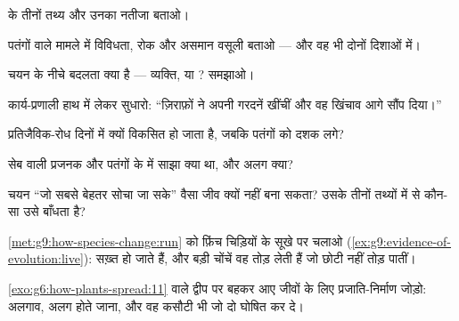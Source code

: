 \begin{exercise}[$\star$]\label{exo:g9:how-species-change:1}
 के तीनों तथ्य और उनका नतीजा बताओ।
\end{exercise}

\begin{exercise}[$\star$]\label{exo:g9:how-species-change:2}
पतंगों वाले मामले में विविधता, रोक और असमान वसूली बताओ --- और वह भी
दोनों दिशाओं में।
\end{exercise}

\begin{exercise}[$\star$]\label{exo:g9:how-species-change:3}
चयन के नीचे बदलता क्या है --- व्यक्ति, या ? समझाओ।
\end{exercise}

\begin{exercise}[$\star$]\label{exo:g9:how-species-change:4}
कार्य-प्रणाली हाथ में लेकर सुधारो: ``ज़िराफ़ों ने अपनी गरदनें खींचीं और
वह खिंचाव आगे सौंप दिया।''
\end{exercise}

\begin{exercise}[$\star$]\label{exo:g9:how-species-change:5}
प्रतिजैविक-रोध दिनों में क्यों विकसित हो जाता है, जबकि पतंगों को दशक
लगे?
\end{exercise}

\begin{exercise}[$\star$]\label{exo:g9:how-species-change:6}
सेब वाली प्रजनक और पतंगों के  में साझा क्या था, और अलग क्या?
\end{exercise}

\begin{exercise}[$\star\star$]\label{exo:g9:how-species-change:7}
चयन ``जो सबसे बेहतर सोचा जा सके'' वैसा जीव क्यों नहीं बना सकता? उसके
तीनों तथ्यों में से कौन-सा उसे बाँधता है?
\end{exercise}

\begin{exercise}[$\star\star$]\label{exo:g9:how-species-change:8}
\cref{met:g9:how-species-change:run} को फ़िंच चिड़ियों के सूखे पर चलाओ
(\cref{ex:g9:evidence-of-evolution:live}):  सख़्त हो जाते हैं, और
बड़ी चोंचें वह तोड़ लेती हैं जो छोटी नहीं तोड़ पातीं।
\end{exercise}

\begin{exercise}[$\star\star$]\label{exo:g9:how-species-change:9}
\cref{exo:g6:how-plants-spread:11} वाले द्वीप पर बहकर आए जीवों के लिए
प्रजाति-निर्माण जोड़ो: अलगाव, अलग होते जाना, और वह कसौटी भी जो दो
 घोषित कर दे।
\end{exercise}

